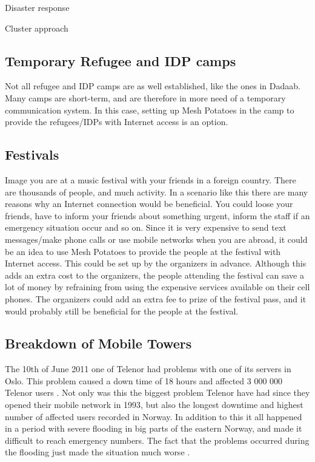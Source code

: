 Disaster response \cite{disasterResponse}

Cluster approach \cite{UNcluster}


\subsection{Temporary Refugee and IDP camps}
Not all refugee and IDP camps are as well established, like the ones in Dadaab. Many camps are short-term, and are therefore in more need of a temporary communication system. In this case, setting up Mesh Potatoes in the camp to provide the refugees/IDPs with Internet access is an option. 

\subsection{Festivals}
Image you are at a music festival with your friends in a foreign country. There are thousands of people, and much activity. In a scenario like this there are many reasons why an Internet connection would be beneficial. You could loose your friends, have to inform your friends about something urgent, inform the staff if an emergency situation occur and so on. Since it is very expensive to send text messages/make phone calls or use mobile networks when you are abroad, it could be an idea to use Mesh Potatoes to provide the people at the festival with Internet access. This could be set up by the organizers in advance. Although this adds an extra cost to the organizers, the people attending the festival can save a lot of money by refraining from using the expensive services available on their cell phones. The organizers could add an extra fee to prize of the festival pass, and it would probably still be beneficial for the people at the festival. 

\subsection{Breakdown of Mobile Towers}

The 10th of June 2011 one of Telenor had problems with one of its servers in Oslo. This problem caused a down time of 18 hours and affected 3 000 000 Telenor users \cite{listeNedetid}. Not only was this the biggest problem Telenor have had since they opened their mobile network in 1993, but also the longest downtime and highest number of affected users recorded in Norway. In addition to this it all happened in a period with severe flooding in big parts of the eastern Norway, and made it difficult to reach emergency numbers. The fact that the problems occurred during the flooding just made the situation much worse \cite{TelenorNede}.


